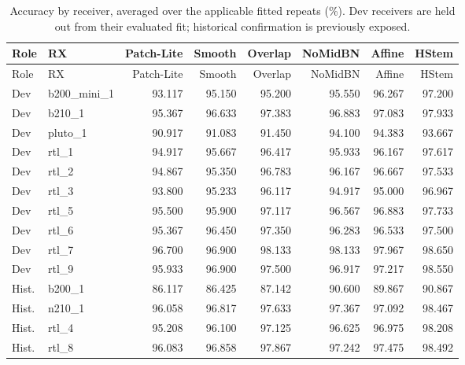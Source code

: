\begin{longtable}{llrrrrrr}
\caption{Accuracy by receiver, averaged over the applicable fitted repeats (\%). Dev receivers are held out from their evaluated fit; historical confirmation is previously exposed.}\label{tab:rx}\\
\toprule Role & RX & Patch-Lite & Smooth & Overlap & NoMidBN & Affine & HStem\\\midrule\endfirsthead
\toprule Role & RX & Patch-Lite & Smooth & Overlap & NoMidBN & Affine & HStem\\\midrule\endhead
Dev & b200\_mini\_1 & 93.117 & 95.150 & 95.200 & 95.550 & 96.267 & 97.200\\
Dev & b210\_1 & 95.367 & 96.633 & 97.383 & 96.883 & 97.083 & 97.933\\
Dev & pluto\_1 & 90.917 & 91.083 & 91.450 & 94.100 & 94.383 & 93.667\\
Dev & rtl\_1 & 94.917 & 95.667 & 96.417 & 95.933 & 96.167 & 97.617\\
Dev & rtl\_2 & 94.867 & 95.350 & 96.783 & 96.167 & 96.667 & 97.533\\
Dev & rtl\_3 & 93.800 & 95.233 & 96.117 & 94.917 & 95.000 & 96.967\\
Dev & rtl\_5 & 95.500 & 95.900 & 97.117 & 96.567 & 96.883 & 97.733\\
Dev & rtl\_6 & 95.367 & 96.450 & 97.350 & 96.283 & 96.533 & 97.500\\
Dev & rtl\_7 & 96.700 & 96.900 & 98.133 & 98.133 & 97.967 & 98.650\\
Dev & rtl\_9 & 95.933 & 96.900 & 97.500 & 96.917 & 97.217 & 98.550\\
Hist. & b200\_1 & 86.117 & 86.425 & 87.142 & 90.600 & 89.867 & 90.867\\
Hist. & n210\_1 & 96.058 & 96.817 & 97.633 & 97.367 & 97.092 & 98.467\\
Hist. & rtl\_4 & 95.208 & 96.100 & 97.125 & 96.625 & 96.975 & 98.208\\
Hist. & rtl\_8 & 96.083 & 96.858 & 97.867 & 97.242 & 97.475 & 98.492\\
\bottomrule\end{longtable}
